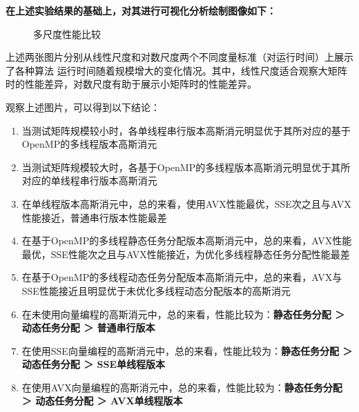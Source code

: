 \documentclass{nku}
\begin{document}
\textbf{在上述实验结果的基础上，对其进行可视化分析绘制图像如下：}
\begin{figure}[H]
    \centering
    \caption{多尺度性能比较}
\end{figure}

上述两张图片分别从线性尺度和对数尺度两个不同度量标准（对运行时间）上展示了各种算法
运行时间随着规模增大的变化情况。其中，线性尺度适合观察大矩阵时的性能差异，对数尺度有助于展示小矩阵时的性能差异。

观察上述图片，可以得到以下结论：
\begin{enumerate}
    \item 当测试矩阵规模较小时，各单线程串行版本高斯消元明显优于其所对应的基于OpenMP的多线程版本高斯消元
    \item 当测试矩阵规模较大时，各基于OpenMP的多线程版本高斯消元明显优于其所对应的单线程串行版本高斯消元
    \item 在单线程版本高斯消元中，总的来看，使用AVX性能最优，SSE次之且与AVX性能接近，普通串行版本性能最差
    \item 在基于OpenMP的多线程静态任务分配版本高斯消元中，总的来看，AVX性能最优，SSE性能次之且与AVX性能接近，为优化多线程静态任务分配性能最差
    \item 在基于OpenMP的多线程动态任务分配版本高斯消元中，总的来看，AVX与SSE性能接近且明显优于未优化多线程动态分配版本的高斯消元
    \item 在未使用向量编程的高斯消元中，总的来看，性能比较为：\textbf{静态任务分配 ＞ 动态任务分配 ＞ 普通串行版本}
    \item 在使用SSE向量编程的高斯消元中，总的来看，性能比较为：\textbf{静态任务分配 ＞ 动态任务分配 ＞ SSE单线程版本}
    \item 在使用AVX向量编程的高斯消元中，总的来看，性能比较为：\textbf{静态任务分配 ＞ 动态任务分配 ＞ AVX单线程版本}
\end{enumerate}
\end{document}
